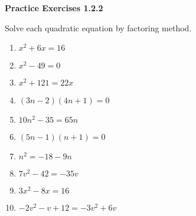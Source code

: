 \noindent\textbf{Practice Exercises 1.2.2}

\vspace{0.75ex}

Solve each quadratic equation by factoring method.

\begin{multicols}{2}
\begin{enumerate}[label = \color{blue}\arabic*. ]
   \item $ x^2 + 6x = 16 $
   \item $ x^2 - 49 = 0 $
   \item $ x^2 + 121 = 22x $
   \item $ (3n - 2)(4n + 1) = 0 $
   \item $ 10n^2 - 35 = 65n $
   \item $ (5n - 1)(n + 1) = 0 $
   \item $ n^2 = -18 - 9n $
   \item $ 7v^2 - 42 = -35v $
   \item $ 3x^2 - 8x = 16 $
   \item $ -2v^2 - v + 12 = -3v^2 + 6v $
\end{enumerate}
\end{multicols}
				
				
